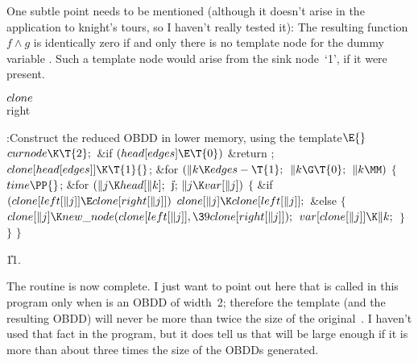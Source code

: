 One subtle point needs to be mentioned (although it doesn't arise in the
application to knight's tours, so I haven't really tested it): The resulting
function $f\land g$ is identically zero if and only there is no template
node for the dummy variable . Such a template node would arise
from the sink node~`1', if it were present.

\Y\B\4\D$\\{clone}$ \5
\\{right}\par
\Y\B\4:Construct the reduced OBDD in lower memory, using the template\X${}%
\E{}$\6
$\\{curnode}\K\T{2};{}$\6
\&{if} ${}(\\{head}[\\{edges}]\E\T{0}){}$\1\5
\&{return} ;\2\6
${}\\{clone}[\\{head}[\\{edges}]]\K\T{1}{}$;\6
\&{for} ${}(\|k\K\\{edges}-\T{1};{}$ ${}\|k\G\T{0};{}$ ${}\|k\MM){}$\5
${}\{{}$\1\6
${}\\{time}\PP{}$;\6
\&{for} ${}(\|j\K\\{head}[\|k];{}$ \|j; ${}\|j\K\\{var}[\|j]){}$\5
${}\{{}$\1\6
\&{if} ${}(\\{clone}[\\{left}[\|j]]\E\\{clone}[\\{right}[\|j]]){}$\1\5
${}\\{clone}[\|j]\K\\{clone}[\\{left}[\|j]];{}$\2\6
\&{else}\5
${}\{{}$\1\6
${}\\{clone}[\|j]\K\\{new\_node}(\\{clone}[\\{left}[\|j]],\39\\{clone}[%
\\{right}[\|j]]);{}$\6
${}\\{var}[\\{clone}[\|j]]\K\|k;{}$\6
\4${}\}{}$\2\6
\4${}\}{}$\2\6
\4${}\}{}$\2\par
\U11.\fi

The  routine is now complete. I just want
to point out here that
 is called in this program only when  is
an OBDD of
width~2; therefore the template (and the resulting OBDD)
will never be more than twice the size of the original~.
I haven't used that fact in the program, but it does tell
us that  will be large enough if it is more than about three
times
the size of the OBDDs generated.


